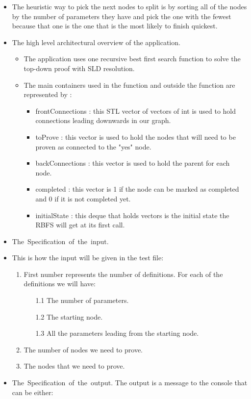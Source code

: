 \documentclass{article}
\begin{document}
\begin{itemize}
\item
The heuristic way to pick the next nodes to split is by sorting all of the nodes by the number of parameters they have and pick the one with the fewest because that one is the one that is the most likely to finish quickest.

\item
The high level architectural overview of the application.
\begin{itemize}
  \item The application uses one recursive best first search function to solve the top-down proof with SLD resolution.
  
  \item The main containers used in the function and outside the function are represented by :
  \begin{itemize}
  \item frontConnections : this STL vector of vectors of int is used to hold connections leading downwards in our graph.
  \item toProve : this vector is used to hold the nodes that will need to be proven as connected to the "yes" node.
   
  \item backConnections : this vector is used to hold the parent for each node.
  
  \item completed : this vector is 1 if the node can be marked as completed and 0 if it is not completed yet.
  
  \item initialState : this deque that holds vectors is the initial state the RBFS will get at its first call.
	\end{itemize}
  
\end{itemize}

\item
\mbox{The Specification of the input.}\linebreak
\linebreak
\item This is how the input will be given in the test file:
\begin{enumerate}	\item First number represents the number of definitions. For each of the definitions we will have:
	\begin{enumerate} \item[1.1] The number of parameters.
		\item[1.2] The starting node.
		\item[1.3] All the parameters leading from the starting node.
		\end{enumerate}
	\item The number of nodes we need to prove.
	\item The nodes that we need to prove.
	\end{enumerate}
\item
\mbox{The Specification of the output.}\linebreak
\linebreak
The output is a message to the console that can be either:


\end{itemize}
\end{document}
